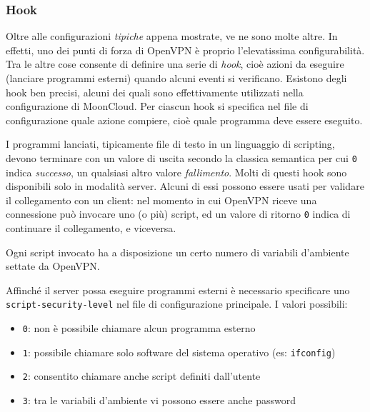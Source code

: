 \subsubsection{Hook}
Oltre alle configurazioni \textit{tipiche} appena mostrate, ve ne sono molte altre. In effetti,
uno dei punti di forza di OpenVPN è proprio l'elevatissima configurabilità.
Tra le altre cose consente di definire una serie di \textit{hook},
cioè azioni da eseguire (lanciare programmi esterni) quando alcuni eventi si verificano.
Esistono degli hook ben precisi, alcuni dei quali sono effettivamente utilizzati
nella configurazione di MoonCloud. Per ciascun hook si specifica nel file di configurazione
quale azione compiere, cioè quale programma deve essere eseguito.

I programmi lanciati, tipicamente file di testo in un linguaggio di scripting, devono 
terminare con un valore di uscita secondo
la classica semantica per cui \texttt{0} indica \textit{successo}, un qualsiasi
altro valore \textit{fallimento}. Molti di questi hook sono disponibili solo in modalità
server. Alcuni di essi possono essere usati per validare il collegamento con
un client: nel momento in cui OpenVPN riceve una connessione può invocare uno (o più)
script, ed un valore di ritorno \texttt{0} indica di continuare il collegamento, e viceversa.

Ogni script invocato ha a disposizione un certo numero di variabili d'ambiente settate
da OpenVPN.


Affinché il server possa eseguire programmi esterni è necessario specificare uno
\texttt{script-security-level} nel file di configurazione principale. I valori possibili:
\begin{itemize}
	\item \texttt{0}: non è possibile chiamare alcun programma esterno
	\item \texttt{1}: possibile chiamare solo software del sistema operativo (es: \texttt{ifconfig})
	\item \texttt{2}: consentito chiamare anche script definiti dall'utente
	\item \texttt{3}: tra le variabili d'ambiente vi possono essere anche password
\end{itemize}

